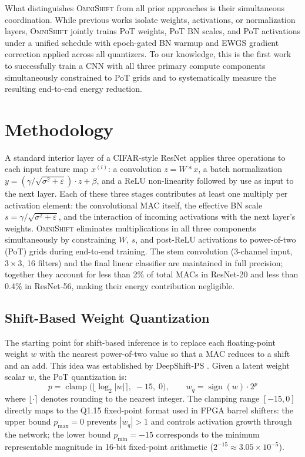\documentclass[12pt]{article}
\newcommand{\omnishift}{\textsc{OmniShift}}
\begin{document}
What distinguishes \omnishift{} from all prior approaches is their simultaneous coordination. While previous works isolate weights, activations, or normalization layers, \omnishift{} jointly trains PoT weights, PoT BN scales, and PoT activations under a unified schedule with epoch-gated BN warmup and EWGS gradient correction applied across all quantizers. To our knowledge, this is the first work to successfully train a CNN with all three primary compute components simultaneously constrained to PoT grids and to systematically measure the resulting end-to-end energy reduction.

\section{Methodology}
\label{sec:method}

A standard interior layer of a CIFAR-style ResNet applies three operations to each input feature map $x^{(l)}$: a convolution $z = W * x$, a batch normalization $y = ({\gamma}/{\sqrt{\sigma^2+\varepsilon}})\cdot z + \beta$, and a ReLU non-linearity followed by use as input to the next layer. Each of these three stages contributes at least one multiply per activation element: the convolutional MAC itself, the effective BN scale $s = \gamma/\sqrt{\sigma^2+\varepsilon}$, and the interaction of incoming activations with the next layer's weights. \omnishift{} eliminates multiplications in all three components simultaneously by constraining $W$, $s$, and post-ReLU activations to power-of-two (PoT) grids during end-to-end training. The stem convolution (3-channel input, $3\times3$, 16 filters) and the final linear classifier are maintained in full precision; together they account for less than 2\% of total MACs in ResNet-20 and less than 0.4\% in ResNet-56, making their energy contribution negligible.

\subsection{Shift-Based Weight Quantization}

The starting point for shift-based inference is to replace each floating-point weight $w$ with the nearest power-of-two value so that a MAC reduces to a shift and an add. This idea was established by DeepShift-PS \cite{elhoushi2021deepshift}. Given a latent weight scalar $w$, the PoT quantization is:
\begin{equation*}
    p = \operatorname{clamp}\!\bigl(\lfloor\log_2|w|\rceil,\; -15,\; 0\bigr), \qquad
    w_q = \operatorname{sign}(w)\cdot 2^p
\end{equation*}
where $\lfloor\cdot\rceil$ denotes rounding to the nearest integer. The clamping range $[-15, 0]$ directly maps to the Q1.15 fixed-point format used in FPGA barrel shifters: the upper bound $p_{\max}=0$ prevents $|w_q|>1$ and controls activation growth through the network; the lower bound $p_{\min}=-15$ corresponds to the minimum representable magnitude in 16-bit fixed-point arithmetic ($2^{-15} \approx 3.05\times10^{-5}$).
\end{document}
